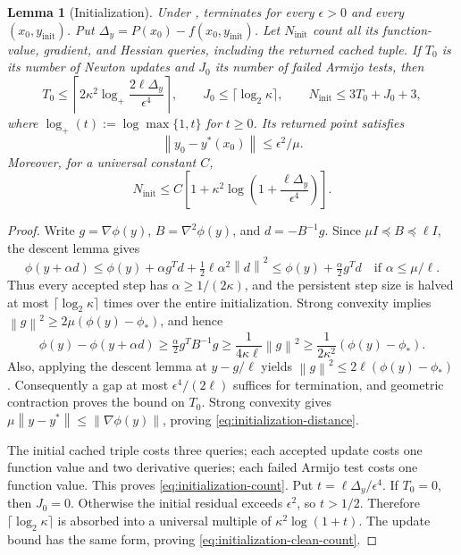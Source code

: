 \documentclass[11pt]{article}
\numberwithin{equation}{section}
\newtheorem{lemma}[assumption]{Lemma}
\newcommand{\eps}{\epsilon}
\newcommand{\norm}[1]{\left\lVert#1\right\rVert}
\begin{document}
\begin{lemma}[Initialization]\label{lem:initialization}
Under ,  terminates for
every $\eps>0$ and every $(x_0,y_{\mathrm{init}})$.
Put $\Delta_y=P(x_0)-f(x_0,y_{\mathrm{init}})$.
Let $N_{\mathrm{init}}$ count all its function-value, gradient, and
Hessian queries, including the returned cached tuple.
If $T_0$ is its number of Newton updates and $J_0$
its number of failed Armijo tests, then
\begin{equation}\label{eq:initialization-count}
 T_0\le\left\lceil2\kappa^2\log_+
                   \frac{2\ell\Delta_y}{\eps^4}\right\rceil,
 \qquad J_0\le\lceil\log_2\kappa\rceil,
 \qquad N_{\mathrm{init}}\le3T_0+J_0+3,
\end{equation}
where $\log_+(t):=\log\max\{1,t\}$ for $t\ge0$.
Its returned point satisfies
\begin{equation}\label{eq:initialization-distance}
 \norm{y_0-y^*(x_0)}\le\eps^2/\mu.
\end{equation}
Moreover, for a universal constant $C$,
\begin{equation}\label{eq:initialization-clean-count}
 N_{\mathrm{init}}
 \le C\left[1+\kappa^2\log\left(1+
                                  \frac{\ell\Delta_y}{\eps^4}\right)\right].
\end{equation}
\end{lemma}

\begin{proof}
Write $g=\nabla\phi(y)$, $B=\nabla^2\phi(y)$, and $d=-B^{-1}g$.
Since $\mu I\preceq B\preceq\ell I$, the descent lemma gives
\[
 \phi(y+\alpha d)
 \le\phi(y)+\alpha g^Td+\tfrac12\ell\alpha^2\norm d^2
 \le\phi(y)+\tfrac\alpha2g^Td
 \quad\text{if }\alpha\le\mu/\ell.
\]
Thus every accepted step has $\alpha\ge1/(2\kappa)$, and the
persistent step size is halved at most $\lceil\log_2\kappa\rceil$
times over the entire initialization. Strong convexity implies
$\norm g^2\ge2\mu(\phi(y)-\phi_*)$, and hence
\[
 \phi(y)-\phi(y+\alpha d)
 \ge\tfrac\alpha2g^TB^{-1}g
 \ge\frac1{4\kappa\ell}\norm g^2
 \ge\frac1{2\kappa^2}(\phi(y)-\phi_*).
\]
Also, applying the descent lemma at $y-g/\ell$ yields
$\norm g^2\le2\ell(\phi(y)-\phi_*)$.
Consequently a gap at most $\eps^4/(2\ell)$ suffices for termination,
and geometric contraction proves the bound on $T_0$.
Strong convexity gives
$\mu\norm{y-y^*}\le\norm{\nabla\phi(y)}$, proving
\eqref{eq:initialization-distance}.

The initial cached triple costs three queries; each accepted update
costs one function value and two derivative queries; each failed
Armijo test costs one function value. This proves
\eqref{eq:initialization-count}.
Put $t=\ell\Delta_y/\eps^4$. If $T_0=0$, then $J_0=0$.
Otherwise the initial residual exceeds $\eps^2$, so
$t>1/2$. Therefore $\lceil\log_2\kappa\rceil$
is absorbed into a universal multiple of $\kappa^2\log(1+t)$.
The update bound has the same form, proving
\eqref{eq:initialization-clean-count}.
\end{proof}
\end{document}
